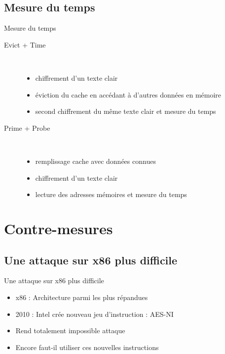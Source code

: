 \documentclass[11pt]{beamer}
\begin{document}
\subsection{Mesure du temps}
\begin{frame}{Mesure du temps~\cite{osvik2006cache}}

\begin{description}
\item [Evict + Time]  ~\\
\begin{itemize}
\item chiffrement d'un texte clair
\item éviction du cache en accédant à d'autres données en mémoire
\item second chiffrement du même texte clair et mesure du temps
\end{itemize}
\item [Prime + Probe]  ~\\
\begin{itemize}
\item remplissage cache avec données connues
\item chiffrement d'un texte clair
\item lecture des adresses mémoires et mesure du temps
\end{itemize}
\end{description}
\end{frame}

\section{Contre-mesures}

\subsection{Une attaque sur x86 plus difficile}
\begin{frame}{Une attaque sur x86 plus difficile}
	\begin{itemize}
		\item x86 : Architecture parmi les plus répandues
		\item 2010 : Intel crée nouveau jeu d'instruction : AES-NI
		\item Rend totalement impossible attaque
		\item Encore faut-il utiliser ces nouvelles instructions
	\end{itemize}
\end{frame}
\end{document}

